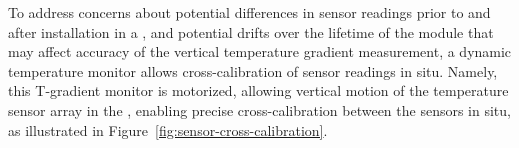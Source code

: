 


 To address concerns about potential differences in sensor readings prior to and after installation in a , and potential drifts over the lifetime of the %
 module that may affect accuracy of the vertical temperature gradient measurement, %
 a dynamic temperature monitor allows cross-calibration of sensor readings %
 in situ.
Namely, this T-gradient monitor is motorized, allowing vertical motion of the temperature sensor array %
in the , %
enabling precise cross-calibration between the sensors %
in situ, as illustrated in Figure~\ref{fig:sensor-cross-calibration}.  

